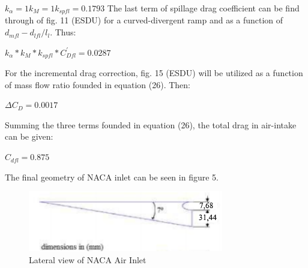 \begin{math}
 k_{\alpha} = 1
 k_{M} = 1 
 k_{spfl} = 0.1793
 \end{math}
The last term of spillage drag coefficient can be find through of fig. 11 (ESDU) for a curved-divergent ramp and as a function of \begin{math} d_{mfl}-d_{lfl}/l_{l} \end{math}. Thus:

\begin{math}
 k_{\alpha}*k_{M}*k_{spfl}*C_{Dfl}^{'} = 0.0287
 
\end{math}  

For the incremental drag correction, fig. 15 (ESDU) will be utilized as a function of mass flow ratio founded in equation (26). Then:

\begin{math}
\Delta C_D = 0.0017
\end{math}

Summing the three terms founded in equation (26), the total drag in air-intake can be given:

\begin{math}
C_{dfl} = 0.875
\end{math}

The final geometry of NACA inlet can be seen in figure 5.

\begin{figure}
     \centering
     \includegraphics{fig/modelled.png}
     \caption{Lateral view of NACA Air Inlet}
     \label{fig:modelled}
 \end{figure}